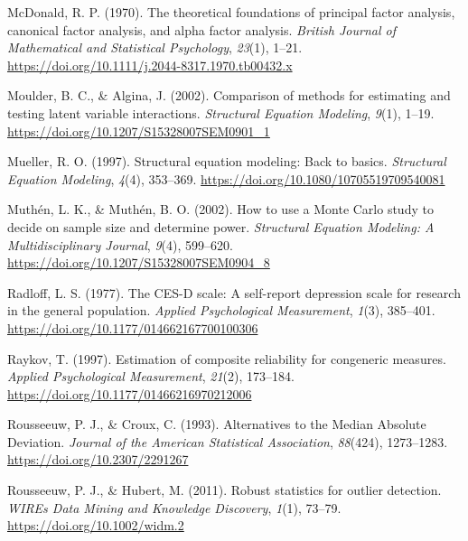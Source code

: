 \documentclass[
  man]{apa6}
\newlength{\cslhangindent}
\newenvironment{CSLReferences}[2] %
 {\begin{list}{}{%
  \setlength{\itemindent}{0pt}
  \setlength{\leftmargin}{0pt}
  \setlength{\parsep}{0pt}
  \ifodd #1
   \setlength{\leftmargin}{\cslhangindent}
   \setlength{\itemindent}{-1\cslhangindent}
  \fi
  \setlength{\itemsep}{#2\baselineskip}}}
 {\end{list}}
\begin{document}
\begin{CSLReferences}{1}{0}
McDonald, R. P. (1970). The theoretical foundations of principal factor analysis, canonical factor analysis, and alpha factor analysis. \emph{British Journal of Mathematical and Statistical Psychology}, \emph{23}(1), 1--21. \url{https://doi.org/10.1111/j.2044-8317.1970.tb00432.x}

Moulder, B. C., \& Algina, J. (2002). Comparison of methods for estimating and testing latent variable interactions. \emph{Structural Equation Modeling}, \emph{9}(1), 1--19. \url{https://doi.org/10.1207/S15328007SEM0901_1}

Mueller, R. O. (1997). Structural equation modeling: {Back} to basics. \emph{Structural Equation Modeling}, \emph{4}(4), 353--369. \url{https://doi.org/10.1080/10705519709540081}

Muthén, L. K., \& Muthén, B. O. (2002). How to use a {Monte Carlo} study to decide on sample size and determine power. \emph{Structural Equation Modeling: A Multidisciplinary Journal}, \emph{9}(4), 599--620. \url{https://doi.org/10.1207/S15328007SEM0904_8}

Radloff, L. S. (1977). The {CES-D} scale: {A} self-report depression scale for research in the general population. \emph{Applied Psychological Measurement}, \emph{1}(3), 385--401. \url{https://doi.org/10.1177/014662167700100306}

Raykov, T. (1997). Estimation of composite reliability for congeneric measures. \emph{Applied Psychological Measurement}, \emph{21}(2), 173--184. \url{https://doi.org/10.1177/01466216970212006}

Rousseeuw, P. J., \& Croux, C. (1993). Alternatives to the {Median Absolute Deviation}. \emph{Journal of the American Statistical Association}, \emph{88}(424), 1273--1283. \url{https://doi.org/10.2307/2291267}

Rousseeuw, P. J., \& Hubert, M. (2011). Robust statistics for outlier detection. \emph{WIREs Data Mining and Knowledge Discovery}, \emph{1}(1), 73--79. \url{https://doi.org/10.1002/widm.2}


\end{CSLReferences}
\end{document}
